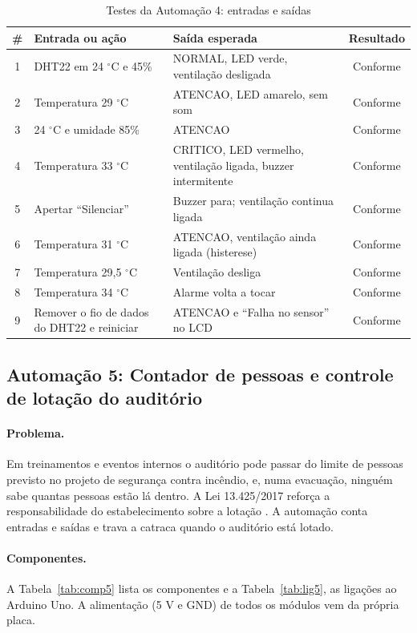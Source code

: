 \documentclass[12pt]{article}
\newcommand{\conf}{Conforme}
\begin{document}
\begin{table}[!htb]
\centering
\caption{Testes da Automação 4: entradas e saídas}\label{tab:teste4}
\small
\begin{tabularx}{\textwidth}{cXXc}
\toprule
\# & Entrada ou ação & Saída esperada & Resultado \\
\midrule
1 & DHT22 em 24 $^\circ$C e 45\% & NORMAL, LED verde, ventilação desligada & \conf \\
2 & Temperatura 29 $^\circ$C & ATENCAO, LED amarelo, sem som & \conf \\
3 & 24 $^\circ$C e umidade 85\% & ATENCAO & \conf \\
4 & Temperatura 33 $^\circ$C & CRITICO, LED vermelho, ventilação ligada, buzzer intermitente & \conf \\
5 & Apertar ``Silenciar'' & Buzzer para; ventilação continua ligada & \conf \\
6 & Temperatura 31 $^\circ$C & ATENCAO, ventilação ainda ligada (histerese) & \conf \\
7 & Temperatura 29,5 $^\circ$C & Ventilação desliga & \conf \\
8 & Temperatura 34 $^\circ$C & Alarme volta a tocar & \conf \\
9 & Remover o fio de dados do DHT22 e reiniciar & ATENCAO e ``Falha no sensor'' no LCD & \conf \\
\bottomrule
\end{tabularx}
\end{table}



\subsection{Automação 5: Contador de pessoas e controle de lotação do auditório}\label{sub:a5}

\paragraph{Problema.} Em treinamentos e eventos internos o auditório pode passar do limite de pessoas previsto no projeto de segurança contra incêndio, e, numa evacuação, ninguém sabe quantas pessoas estão lá dentro. A Lei 13.425/2017 reforça a responsabilidade do estabelecimento sobre a lotação \cite{lei13425}. A automação conta entradas e saídas e trava a catraca quando o auditório está lotado.

\paragraph{Componentes.} A Tabela~\ref{tab:comp5} lista os componentes e a Tabela~\ref{tab:lig5}, as ligações ao Arduino Uno. A alimentação (5 V e GND) de todos os módulos vem da própria placa.
\end{document}
